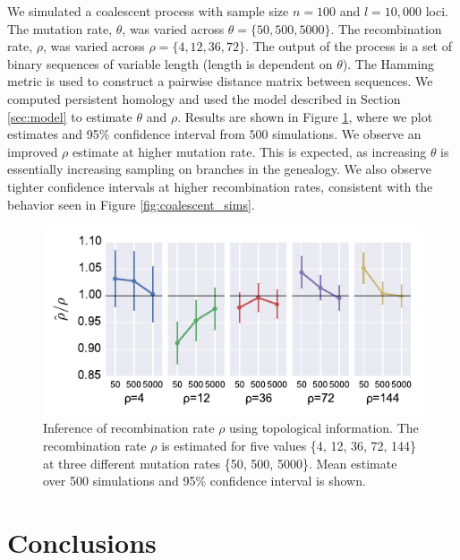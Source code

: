 We simulated a coalescent process with sample size $n=100$ and $l=10{,}000$ loci.
The mutation rate, $\theta$, was varied across $\theta=\{50,500,5000\}$.
The recombination rate, $\rho$, was varied across $\rho=\{4,12,36,72\}$.
The output of the process is a set of binary sequences of variable length (length is dependent on $\theta$).
The Hamming metric is used to construct a pairwise distance matrix between sequences.
We computed persistent homology and used the model described in Section \ref{sec:model} to estimate $\theta$ and $\rho$.
Results are shown in Figure \ref{fig:param_inference}, where we plot estimates and 95\% confidence interval from $500$ simulations.
We observe an improved $\rho$ estimate at higher mutation rate.
This is expected, as increasing $\theta$ is essentially increasing sampling on branches in the genealogy.
We also observe tighter confidence intervals at higher recombination rates, consistent with the behavior seen in Figure \ref{fig:coalescent_sims}.

\begin{figure}
\begin{center}
\centerline{\includegraphics[width=\columnwidth]{./fig/param_inference.pdf}}
\caption[Inference of recombination rate $\rho$ using topological information]{Inference of recombination rate $\rho$ using topological information. The recombination rate $\rho$ is estimated for five values \{4, 12, 36, 72, 144\} at three different mutation rates \{50, 500, 5000\}. Mean estimate over 500 simulations and 95\% confidence interval is shown.}
\label{fig:param_inference}
\end{center}
\end{figure}

\section{Conclusions}
\label{parametric_inference:sec:discussion}

